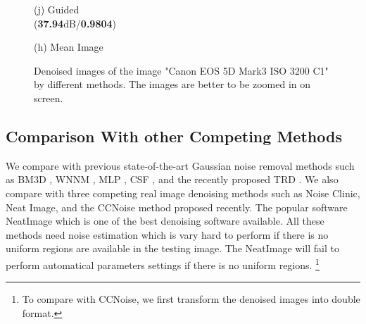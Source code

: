 \documentclass[10pt,twocolumn,letterpaper]{article}
\begin{document}
\begin{figure}
{\begin{minipage}[t]{0.195\textwidth}
{\footnotesize (j) Guided \\ (\textbf{37.94}dB/\textbf{0.9804})}
\end{minipage}
\begin{minipage}[t]{0.195\textwidth}
\centering
{}
{\footnotesize (h) Mean Image }
\end{minipage}
}
\caption{Denoised images of the image "Canon EOS 5D Mark3 ISO 3200 C1" by different methods. The images are better to be zoomed in on screen.}
\end{figure}


\subsection{Comparison With other Competing Methods}
We compare with previous state-of-the-art Gaussian noise removal methods such as BM3D \cite{bm3d}, WNNM \cite{wnnm}, MLP \cite{mlp}, CSF \cite{csf}, and the recently proposed TRD \cite{chen2015learning}. We also compare with three competing real image denoising methods such as Noise Clinic, Neat Image, and the CCNoise method proposed recently. The popular software NeatImage which is one of the best denoising software available. All these methods need noise estimation which is vary hard to perform if there is no uniform regions are available in the testing image. The NeatImage will fail to perform automatical parameters settings if there is no uniform regions. \footnote{To compare with CCNoise, we first transform the denoised images into double format.}
\end{document}
